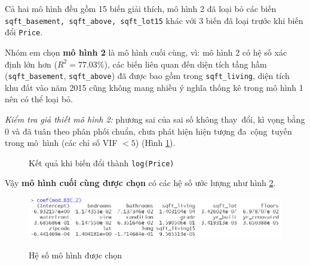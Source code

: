 Cả hai mô hình đều gồm 15 biến giải thích, mô hình 2 đã loại bỏ các biến \texttt{sqft\_basement, sqft\_above, sqft\_lot15} khác với 3 biến đã loại trước khi biến đổi \texttt{Price}. 

Nhóm em chọn \textbf{mô hình 2} là mô hình cuối cùng, vì: mô hình 2 có hệ số xác định lớn hơn ($R^2=77.03\%$), các biến liên quan đến diện tích tầng hầm (\texttt{sqft\_basement}, \texttt{sqft\_above}) đã được bao gồm trong \texttt{sqft\_living}, diện tích khu đất vào năm 2015 cũng không mang nhiều ý nghĩa thống kê trong mô hình 1 nên có thể loại bỏ.

\textit{Kiểm tra giả thiết mô hình 2:} phương sai của sai số không thay~đổi, kì vọng bằng 0 và đã tuân theo phân phối chuẩn, chưa phát hiện hiện tượng đa~cộng~tuyến trong mô~hình (các chỉ số VIF $< 5$) (Hình \ref{B2_final}). 

 \begin{figure}[H]
	\centering
	\hfill
	\caption{Kết quả khi biến đổi thành \texttt{log(Price)}}
	\label{B2_final}
\end{figure}

Vậy \textbf{mô hình cuối cùng được chọn} có các hệ số ước lượng như hình \ref{B2_coef}.
\begin{figure}[H]
	\centering
	{\includegraphics[width=\linewidth]{../Photo Of Result/B2_coef}}
	\caption{Hệ số mô hình được chọn}
	\label{B2_coef}
\end{figure}


